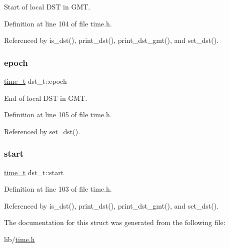 Start of local D\+ST in G\+MT. 



Definition at line 104 of file time.\+h.



Referenced by is\+\_\+dst(), print\+\_\+dst(), print\+\_\+dst\+\_\+gmt(), and set\+\_\+dst().

\mbox{\label{structdst__t_ae8b931e1a2731b688e1af1253787827c}} 
\subsubsection{\texorpdfstring{epoch}{epoch}}
{\footnotesize\ttfamily \hyperlink{time_8h_a3346b04b0420b32ccf6b706551b70762}{time\+\_\+t} dst\+\_\+t\+::epoch}



End of local D\+ST in G\+MT. 



Definition at line 105 of file time.\+h.



Referenced by set\+\_\+dst().

\mbox{\label{structdst__t_af1868fb321db3637664e3a3bf11cf56b}} 
\subsubsection{\texorpdfstring{start}{start}}
{\footnotesize\ttfamily \hyperlink{time_8h_a3346b04b0420b32ccf6b706551b70762}{time\+\_\+t} dst\+\_\+t\+::start}



Definition at line 103 of file time.\+h.



Referenced by is\+\_\+dst(), print\+\_\+dst(), print\+\_\+dst\+\_\+gmt(), and set\+\_\+dst().



The documentation for this struct was generated from the following file\+:\begin{DoxyCompactItemize}
\item 
lib/\hyperlink{time_8h}{time.\+h}\end{DoxyCompactItemize}
